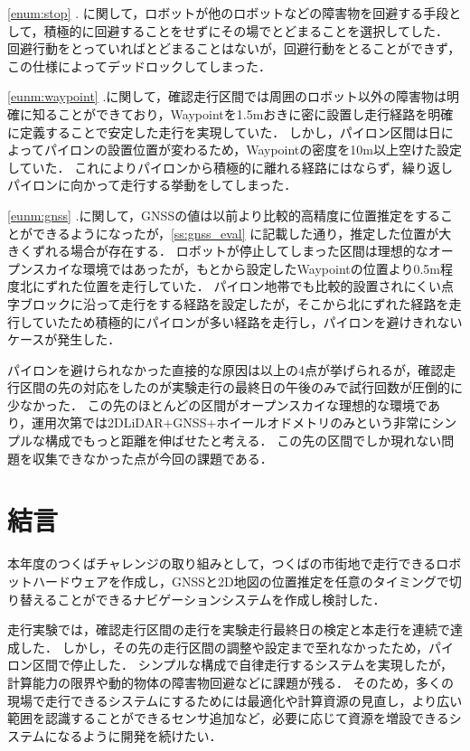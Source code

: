 \documentclass[platex,dvipdfmx]{rbproceedings}
\begin{document}
\ref{enum:stop} . に関して，ロボットが他のロボットなどの障害物を回避する手段として，積極的に回避することをせずにその場でとどまることを選択してした．
回避行動をとっていればとどまることはないが，回避行動をとることができず，この仕様によってデッドロックしてしまった．

\ref{eunm:waypoint} .に関して，確認走行区間では周囲のロボット以外の障害物は明確に知ることができており，Waypointを1.5mおきに密に設置し走行経路を明確に定義することで安定した走行を実現していた．
しかし，パイロン区間は日によってパイロンの設置位置が変わるため，Waypointの密度を10m以上空けた設定していた．
これによりパイロンから積極的に離れる経路にはならず，繰り返しパイロンに向かって走行する挙動をしてしまった．

\ref{eunm:gnss} .に関して，GNSSの値は以前より比較的高精度に位置推定をすることができるようになったが，\ref{ss:gnss_eval} に記載した通り，推定した位置が大きくずれる場合が存在する．
ロボットが停止してしまった区間は理想的なオープンスカイな環境ではあったが，もとから設定したWaypointの位置より0.5m程度北にずれた位置を走行していた．
パイロン地帯でも比較的設置されにくい点字ブロックに沿って走行をする経路を設定したが，そこから北にずれた経路を走行していたため積極的にパイロンが多い経路を走行し，パイロンを避けきれないケースが発生した．

パイロンを避けられなかった直接的な原因は以上の4点が挙げられるが，確認走行区間の先の対応をしたのが実験走行の最終日の午後のみで試行回数が圧倒的に少なかった．
この先のほとんどの区間がオープンスカイな理想的な環境であり，運用次第では2DLiDAR+GNSS+ホイールオドメトリのみという非常にシンプルな構成でもっと距離を伸ばせたと考える．
この先の区間でしか現れない問題を収集できなかった点が今回の課題である．

\section{結言}
本年度のつくばチャレンジの取り組みとして，つくばの市街地で走行できるロボットハードウェアを作成し，GNSSと2D地図の位置推定を任意のタイミングで切り替えることができるナビゲーションシステムを作成し検討した．

走行実験では，確認走行区間の走行を実験走行最終日の検定と本走行を連続で達成した．
しかし，その先の走行区間の調整や設定まで至れなかったため，パイロン区間で停止した．
シンプルな構成で自律走行するシステムを実現したが，計算能力の限界や動的物体の障害物回避などに課題が残る．
そのため，多くの現場で走行できるシステムにするためには最適化や計算資源の見直し，より広い範囲を認識することができるセンサ追加など，必要に応じて資源を増設できるシステムになるように開発を続けたい．
\end{document}
